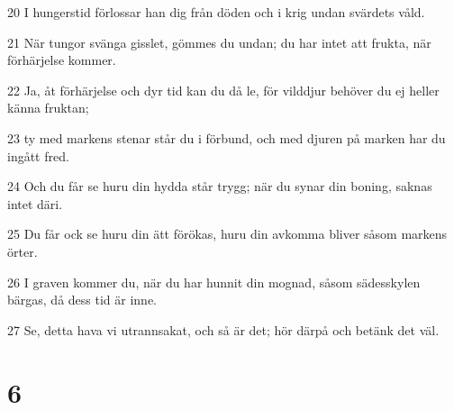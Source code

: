 \par 20 I hungerstid förlossar han dig från döden och i krig undan svärdets våld.
\par 21 När tungor svänga gisslet, gömmes du undan; du har intet att frukta, när förhärjelse kommer.
\par 22 Ja, åt förhärjelse och dyr tid kan du då le, för vilddjur behöver du ej heller känna fruktan;
\par 23 ty med markens stenar står du i förbund, och med djuren på marken har du ingått fred.
\par 24 Och du får se huru din hydda står trygg; när du synar din boning, saknas intet däri.
\par 25 Du får ock se huru din ätt förökas, huru din avkomma bliver såsom markens örter.
\par 26 I graven kommer du, när du har hunnit din mognad, såsom sädesskylen bärgas, då dess tid är inne.
\par 27 Se, detta hava vi utrannsakat, och så är det; hör därpå och betänk det väl.

\chapter{6}

